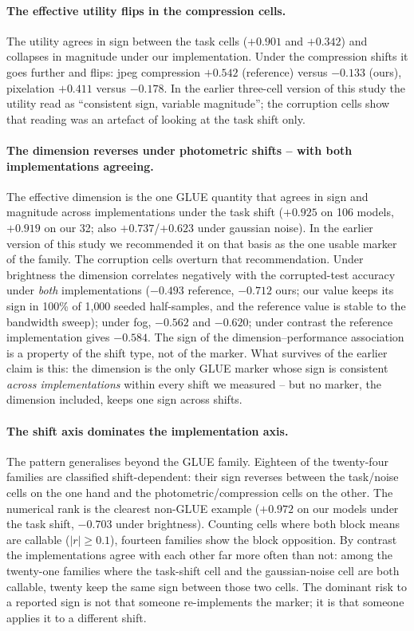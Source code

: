 \documentclass[10pt]{article}
\begin{document}
\paragraph{The effective utility flips in the compression cells.}
The utility agrees in sign between the task cells ($+0.901$ and $+0.342$) and
collapses in magnitude under our implementation. Under the compression shifts
it goes further and flips: jpeg compression $+0.542$ (reference) versus
$-0.133$ (ours), pixelation $+0.411$ versus $-0.178$. In the earlier
three-cell version of this study the utility read as ``consistent sign,
variable magnitude''; the corruption cells show that reading was an artefact
of looking at the task shift only.

\paragraph{The dimension reverses under photometric shifts -- with both implementations agreeing.}
The effective dimension is the one GLUE quantity that agrees in sign and
magnitude across implementations under the task shift ($+0.925$ on 106 models,
$+0.919$ on our 32; also $+0.737$/$+0.623$ under gaussian noise). In the
earlier version of this study we recommended it on that basis as the one
usable marker of the family. The corruption cells overturn that
recommendation. Under brightness the dimension correlates negatively with the
corrupted-test accuracy under \emph{both} implementations ($-0.493$ reference,
$-0.712$ ours; our value keeps its sign in 100\% of 1{,}000 seeded
half-samples, and the reference value is stable to the bandwidth sweep);
under fog, $-0.562$ and $-0.620$; under contrast the reference
implementation gives $-0.584$. The sign of the dimension--performance
association is a property of the shift type, not of the marker. What survives
of the earlier claim is this: the dimension is the only GLUE marker whose sign
is consistent \emph{across implementations} within every shift we measured --
but no marker, the dimension included, keeps one sign across shifts.

\paragraph{The shift axis dominates the implementation axis.}
The pattern generalises beyond the GLUE family. Eighteen of the twenty-four
families are classified shift-dependent: their sign reverses between the
task/noise cells on the one hand and the photometric/compression cells on the
other. The numerical rank is the clearest non-GLUE example ($+0.972$ on our
models under the task shift, $-0.703$ under brightness). Counting cells where
both block means are callable ($|r|\ge 0.1$), fourteen families show the
block opposition. By contrast the implementations agree with each other
far more often than not: among the twenty-one families where the task-shift
cell and the gaussian-noise cell are both callable, twenty keep the same sign
between those two cells. The dominant risk to a reported sign is not that
someone re-implements the marker; it is that someone applies it to a different
shift.
\end{document}
